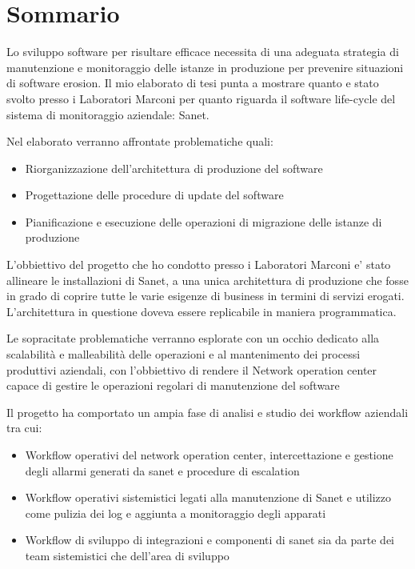 \chapter*{Sommario}

Lo sviluppo software per risultare efficace necessita di una adeguata strategia di manutenzione e monitoraggio delle istanze in produzione per prevenire situazioni di software erosion. Il mio elaborato di tesi punta a mostrare quanto e stato svolto presso i Laboratori Marconi per quanto riguarda il software life-cycle del sistema di monitoraggio aziendale: Sanet.

Nel elaborato verranno affrontate problematiche quali:

\begin{itemize}
  \item Riorganizzazione dell'architettura di produzione del software
  \item Progettazione delle procedure di update del software
  \item Pianificazione e esecuzione delle operazioni di migrazione delle istanze di produzione
\end{itemize}

L'obbiettivo del progetto che ho condotto presso i Laboratori Marconi e' stato allineare le installazioni di Sanet, a una unica architettura di produzione che fosse in grado di coprire tutte le varie esigenze di business in termini di servizi erogati. L'architettura in questione doveva essere replicabile in maniera programmatica.

Le sopracitate problematiche verranno esplorate con un occhio dedicato alla scalabilità e malleabilità delle operazioni e al mantenimento dei processi produttivi aziendali, con l'obbiettivo di rendere il Network operation center capace di gestire le operazioni regolari di manutenzione del software

Il progetto ha comportato un ampia fase di analisi e studio dei workflow aziendali tra cui:

\begin{itemize}
  \item Workflow operativi del network operation center, intercettazione e gestione degli allarmi generati da sanet e procedure di escalation
  \item Workflow operativi sistemistici legati alla manutenzione di Sanet e utilizzo come pulizia dei log e aggiunta a monitoraggio degli apparati
  \item Workflow di sviluppo di integrazioni e componenti di sanet sia da parte dei team sistemistici che dell'area di sviluppo
\end{itemize}

